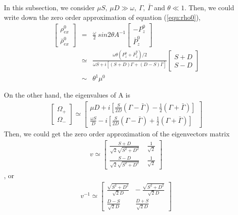 \documentclass[aps,prd,twocolumn,amsmath,amssymb,groupedaddress]{revtex4-2}
\begin{document}
In this subsection, we consider $\mu S, ~\mu D \gg \omega, ~\Gamma, ~\bar{\Gamma} $ and $\theta \ll 1$. Then, we could write down the zero order approximation of equation (\ref{equ:rho0}),
\begin{eqnarray}
	\begin{bmatrix} 
		\rho^0_{ex} \\ \bar{\rho}^0_{ex}
	\end{bmatrix} 
	&=& \frac{\omega}{2} ~sin2\theta A^{-1} \begin{bmatrix}
		-P_{z}^0 \\ \bar{P}_{z}^0
	\end{bmatrix} \nonumber \\
	\label{equ:0_rho0}
	&\simeq&
	\frac{\omega \theta \left(P_{z}^0 + \bar{P}_{z}^0\right)/2}{\omega S + i\left[(S+D) \Gamma + (D-S) \bar{\Gamma}\right]}
	\begin{bmatrix}
		S+D \\ S-D
	\end{bmatrix} \\
	&\sim& \theta^1 \mu^0
\end{eqnarray}

On the other hand, the eigenvalues of A is
\begin{eqnarray}
	\begin{bmatrix}
		\Omega_+ \\ \Omega_-
	\end{bmatrix} \simeq
	\begin{bmatrix}
		\mu D + i \left[\frac{S}{2D}\left(\Gamma-\bar{\Gamma}\right)-\frac{1}{2}\left(\Gamma+\bar{\Gamma}\right)\right]\\
		\frac{\omega S}{D} - i \left[\frac{S}{2D}\left(\Gamma-\bar{\Gamma}\right)+\frac{1}{2}\left(\Gamma+\bar{\Gamma}\right)\right]
	\end{bmatrix}
\end{eqnarray}
Then, we could get the zero order approximation of the eigenvectors matrix 
\begin{eqnarray}
	\label{equ:0_eigenvectors}
	v \simeq
	\begin{bmatrix}
		\frac{S+D}{\sqrt{2}\sqrt{S^2+D^2}} ~~~~~ \frac{1}{\sqrt{2}}\\
		\frac{S-D}{\sqrt{2}\sqrt{S^2+D^2}} ~~~~~ \frac{1}{\sqrt{2}}
	\end{bmatrix}
\end{eqnarray}, or
\begin{eqnarray}
	\label{equ:0_antieigenvectors}
	v^{-1}\simeq
	\begin{bmatrix}
		\frac{\sqrt{S^2+D^2}}{\sqrt{2}D} ~~~ -\frac{\sqrt{S^2+D^2}}{\sqrt{2}D}\\
		\frac{D-S}{\sqrt{2}D} ~~~~~~~~~~ \frac{D+S}{\sqrt{2}D}
	\end{bmatrix}
\end{eqnarray}
\end{document}
